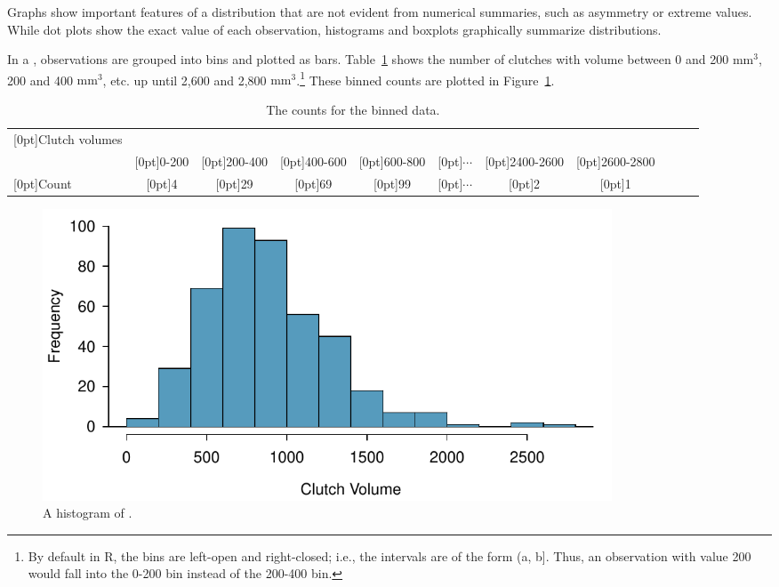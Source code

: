 Graphs show important features of a distribution that are not evident from numerical summaries, such as asymmetry or extreme values. While dot plots show the exact value of each observation, histograms and boxplots graphically summarize distributions.

In a , observations are grouped into bins and plotted as bars. Table~\ref{frogBinnedClutchVolTable} shows the number of clutches with volume between 0 and 200 $\textrm{mm}^{3}$, 200 and 400 $\textrm{mm}^{3}$, etc. up until 2,600 and 2,800 $\textrm{mm}^{3}$.\footnote{By default in \textsf{R}, the bins are left-open and right-closed; i.e., the intervals are of the form (a, b]. Thus, an observation with value 200 would fall into the 0-200 bin instead of the 200-400 bin.} These binned counts are plotted in Figure~\ref{frogHist}.

\begin{table}[ht]
	\centering\small
	\begin{tabular}{l ccc ccc ccc c}
		\hline
		\raisebox{-1.5ex}[0pt]{Clutch volumes} & \\
		& \raisebox{1.5ex}[0pt]{0-200} & \raisebox{1.5ex}[0pt]{200-400} & \raisebox{1.5ex}[0pt]{400-600} & \raisebox{1.5ex}[0pt]{600-800} & \raisebox{1.5ex}[0pt]{$\cdots$} & \raisebox{1.5ex}[0pt]{2400-2600} & \raisebox{1.5ex}[0pt]{2600-2800} \\
		\hline
		\raisebox{-.25ex}[0pt]{Count} & \raisebox{-.25ex}[0pt]{4} & \raisebox{-.25ex}[0pt]{29} & \raisebox{-.25ex}[0pt]{69} & \raisebox{-.25ex}[0pt]{99} & \raisebox{-.25ex}[0pt]{$\cdots$} & \raisebox{-.25ex}[0pt]{2} & \raisebox{-.25ex}[0pt]{1} \\
		\hline
	\end{tabular}
	\caption{The counts for the binned  data.}
	\label{frogBinnedClutchVolTable}
\end{table}

\begin{figure}[ht]
	\centering
	\includegraphics[width=0.82\textwidth]{ch_intro_to_data_oi_biostat/figures/frogHist/frogHist}
	\caption{A histogram of .}
	\label{frogHist}
\end{figure}

